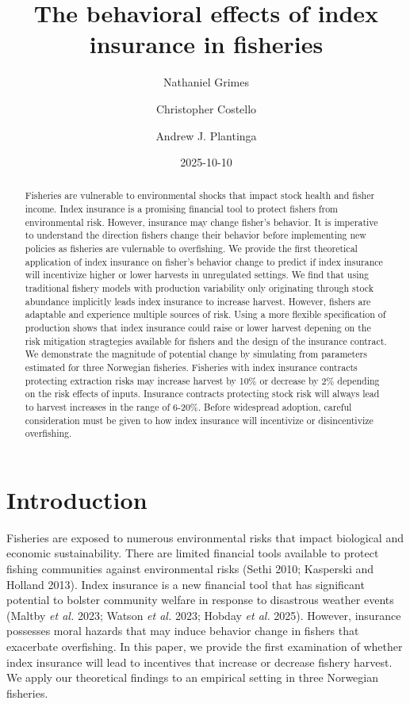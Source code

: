 \documentclass[
  letterpaper,
  DIV=11,
  numbers=noendperiod]{scrartcl}
\title{The behavioral effects of index insurance in fisheries}
\author{Nathaniel Grimes \and Christopher Costello \and Andrew J.
Plantinga}
\date{2025-10-10}
\renewcommand*\contentsname{Table of contents}
\newcommand\contentsname{Table of contents}
\theoremstyle{plain}
\theoremstyle{plain}
\theoremstyle{remark}
\begin{document}
\maketitle
\begin{abstract}
Fisheries are vulnerable to environmental shocks that impact stock
health and fisher income. Index insurance is a promising financial tool
to protect fishers from environmental risk. However, insurance may
change fisher's behavior. It is imperative to understand the direction
fishers change their behavior before implementing new policies as
fisheries are vulernable to overfishing. We provide the first
theoretical application of index insurance on fisher's behavior change
to predict if index insurance will incentivize higher or lower harvests
in unregulated settings. We find that using traditional fishery models
with production variability only originating through stock abundance
implicitly leads index insurance to increase harvest. However, fishers
are adaptable and experience multiple sources of risk. Using a more
flexible specification of production shows that index insurance could
raise or lower harvest depening on the risk mitigation stragtegies
available for fishers and the design of the insurance contract. We
demonstrate the magnitude of potential change by simulating from
parameters estimated for three Norwegian fisheries. Fisheries with index
insurance contracts protecting extraction risks may increase harvest by
10\% or decrease by 2\% depending on the risk effects of inputs.
Insurance contracts protecting stock risk will always lead to harvest
increases in the range of 6-20\%. Before widespread adoption, careful
consideration must be given to how index insurance will incentivize or
disincentivize overfishing.
\end{abstract}

\renewcommand*\contentsname{Table of contents}
{
\hypersetup{linkcolor=}
\setcounter{tocdepth}{3}
\tableofcontents
}

\section{Introduction}\label{introduction}

Fisheries are exposed to numerous environmental risks that impact
biological and economic sustainability. There are limited financial
tools available to protect fishing communities against environmental
risks (Sethi 2010; Kasperski and Holland 2013). Index insurance is a new
financial tool that has significant potential to bolster community
welfare in response to disastrous weather events (Maltby \emph{et al.}
2023; Watson \emph{et al.} 2023; Hobday \emph{et al.} 2025). However,
insurance possesses moral hazards that may induce behavior change in
fishers that exacerbate overfishing. In this paper, we provide the first
examination of whether index insurance will lead to incentives that
increase or decrease fishery harvest. We apply our theoretical findings
to an empirical setting in three Norwegian fisheries.
\end{document}
